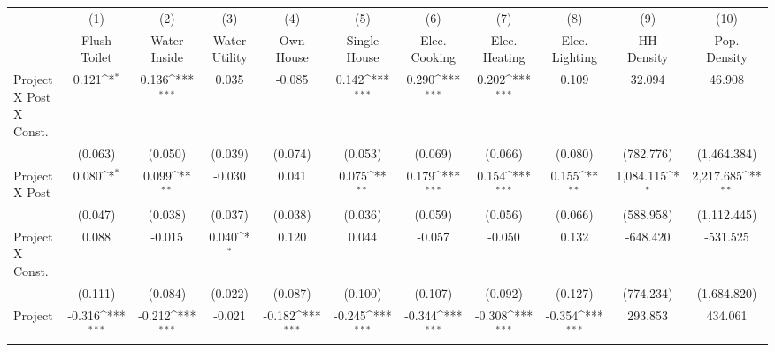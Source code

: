 {
\footnotesize
\def\sym#1{\ifmmode^{#1}\else\(^{#1}\)\fi}
\begin{tabular}{l*{10}{c}}
\hline\hline
                &\multicolumn{1}{c}{(1)}&\multicolumn{1}{c}{(2)}&\multicolumn{1}{c}{(3)}&\multicolumn{1}{c}{(4)}&\multicolumn{1}{c}{(5)}&\multicolumn{1}{c}{(6)}&\multicolumn{1}{c}{(7)}&\multicolumn{1}{c}{(8)}&\multicolumn{1}{c}{(9)}&\multicolumn{1}{c}{(10)}\\
                &\multicolumn{1}{c}{Flush Toilet}&\multicolumn{1}{c}{Water Inside}&\multicolumn{1}{c}{Water Utility}&\multicolumn{1}{c}{Own House}&\multicolumn{1}{c}{Single House}&\multicolumn{1}{c}{Elec. Cooking}&\multicolumn{1}{c}{Elec. Heating}&\multicolumn{1}{c}{Elec. Lighting}&\multicolumn{1}{c}{HH Density}&\multicolumn{1}{c}{Pop. Density}\\
\hline
Project X Post X Const.&    0.121\sym{*}  &    0.136\sym{***}&    0.035         &   -0.085         &    0.142\sym{***}&    0.290\sym{***}&    0.202\sym{***}&    0.109         &   32.094         &   46.908         \\
                &  (0.063)         &  (0.050)         &  (0.039)         &  (0.074)         &  (0.053)         &  (0.069)         &  (0.066)         &  (0.080)         &(782.776)         &(1,464.384)         \\
[1em]
Project X Post  &    0.080\sym{*}  &    0.099\sym{**} &   -0.030         &    0.041         &    0.075\sym{**} &    0.179\sym{***}&    0.154\sym{***}&    0.155\sym{**} &1,084.115\sym{*}  &2,217.685\sym{**} \\
                &  (0.047)         &  (0.038)         &  (0.037)         &  (0.038)         &  (0.036)         &  (0.059)         &  (0.056)         &  (0.066)         &(588.958)         &(1,112.445)         \\
[1em]
Project X Const.&    0.088         &   -0.015         &    0.040\sym{*}  &    0.120         &    0.044         &   -0.057         &   -0.050         &    0.132         & -648.420         & -531.525         \\
                &  (0.111)         &  (0.084)         &  (0.022)         &  (0.087)         &  (0.100)         &  (0.107)         &  (0.092)         &  (0.127)         &(774.234)         &(1,684.820)         \\
[1em]
Project         &   -0.316\sym{***}&   -0.212\sym{***}&   -0.021         &   -0.182\sym{***}&   -0.245\sym{***}&   -0.344\sym{***}&   -0.308\sym{***}&   -0.354\sym{***}&  293.853         &  434.061         \\

\end{tabular}}
